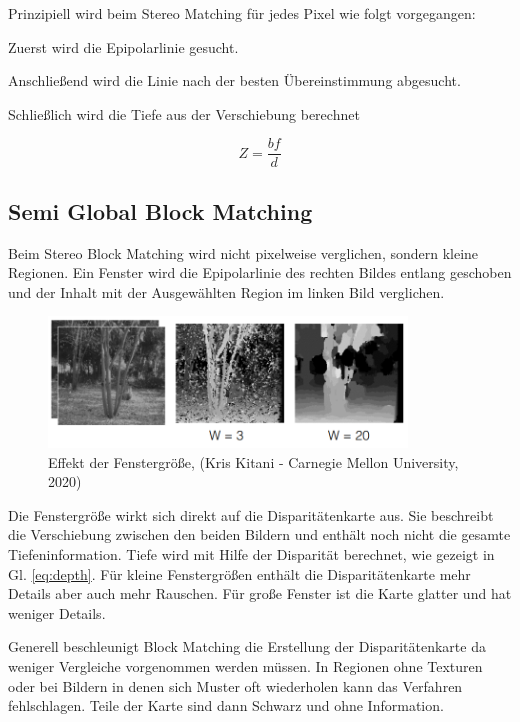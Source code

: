 Prinzipiell wird beim Stereo Matching für jedes Pixel wie folgt vorgegangen:

Zuerst wird die Epipolarlinie gesucht. 

Anschlie{\ss}end wird die Linie nach der besten Übereinstimmung abgesucht.

Schlie{\ss}lich wird die Tiefe aus der Verschiebung berechnet

\begin{equation}
  Z = \frac{bf}{d}
  \label{eq:depth}
\end{equation}

\subsection{Semi Global Block Matching}
Beim Stereo Block Matching wird nicht pixelweise verglichen, sondern kleine Regionen. Ein Fenster wird die Epipolarlinie des rechten Bildes entlang geschoben und der Inhalt mit der Ausgewählten Region im linken Bild verglichen.
\begin{figure}[!ht]
  \centering
  \includegraphics[width=0.85\textwidth]{pictures/03_windowsize.png}
  \caption[Effekt der Fenstergö{\ss}e bei Disparitätenkarten]{Effekt der Fenstergrö{\ss}e, (Kris Kitani - Carnegie Mellon University, 2020)}
\end{figure}

Die Fenstergrö{\ss}e wirkt sich direkt auf die Disparitätenkarte aus. Sie beschreibt die Verschiebung zwischen den beiden Bildern und enthält noch nicht die gesamte Tiefeninformation. Tiefe wird mit Hilfe der Disparität berechnet, wie gezeigt in Gl. \ref{eq:depth}. Für kleine Fenstergrö{\ss}en enthält die Disparitätenkarte mehr Details aber auch mehr Rauschen. Für gro{\ss}e Fenster ist die Karte glatter und hat weniger Details.

Generell beschleunigt Block Matching die Erstellung der Disparitätenkarte da weniger Vergleiche vorgenommen werden müssen. In Regionen ohne Texturen oder bei Bildern in denen sich Muster oft wiederholen kann das Verfahren fehlschlagen. Teile der Karte sind dann Schwarz und ohne Information. 

